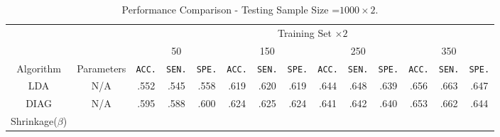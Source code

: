 \documentclass{article}
\begin{document}
\begin{table*}
\footnotesize{
\begin{center}
\caption{Performance Comparison - Testing Sample Size =$1000\times 2$.}
		\label{tab:table12}
\begin{tabular}{*{14}{c}}
\toprule
    & & \multicolumn{12}{c}{Training Set $\times 2$}\\
    \cmidrule(lr){3-14}
    & & 
    \multicolumn{3}{c}{50} &
    \multicolumn{3}{c}{150} &
    \multicolumn{3}{c}{250} &
    \multicolumn{3}{c}{350} \\
\cmidrule(lr){3-5}
\cmidrule(lr){6-8}
\cmidrule(lr){9-11}
\cmidrule(lr){12-14}
Algorithm & Parameters & \texttt{ACC.} & \texttt{SEN.} & \texttt{SPE.} &
						\texttt{ACC.} & \texttt{SEN.} & \texttt{SPE.} &
                           \texttt{ACC.} & \texttt{SEN.} & \texttt{SPE.} &
                           \texttt{ACC.} & \texttt{SEN.} & \texttt{SPE.} \\
 \cmidrule(lr){1-2}                        
 \cmidrule(lr){3-5}
\cmidrule(lr){6-8}
\cmidrule(lr){9-11}
\cmidrule(lr){12-14}
    LDA & N/A &   .552 & .545 & .558 &     .619 & .620 & .619     & .644 & .648 & .639     & .656 & .663 & .647  \\
 
     \cmidrule(lr){1-2}                        
 \cmidrule(lr){3-5}
\cmidrule(lr){6-8}
\cmidrule(lr){9-11}
\cmidrule(lr){12-14}
    DIAG & N/A &   .595 & .588 & .600 &     .624 & .625 & .624     & .641 & .642 & .640    & .653 & .662 & .644 \\
    \cmidrule(lr){1-2}                        
 \cmidrule(lr){3-5}
\cmidrule(lr){6-8}
\cmidrule(lr){9-11}
\cmidrule(lr){12-14}

    \multirow{3}{*}{Shrinkage($\beta$)} 


\end{tabular}
\end{center}}
\end{table*}
\end{document}
